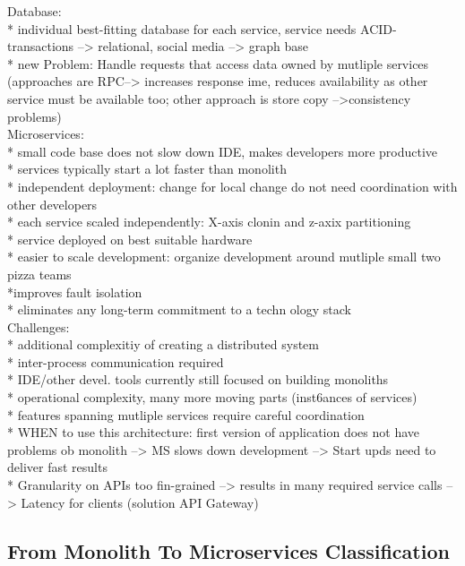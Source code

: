 Database: \\
* individual best-fitting database for each service, service needs ACID-transactions --> relational, social media --> graph base\\
* new Problem: Handle requests that access data owned by mutliple services (approaches are RPC--> increases response ime, reduces availability as other service must be available too; other approach is store copy -->consistency problems)\\

Microservices:\\
* small code base does not slow down IDE, makes developers more productive\\
* services typically start a lot faster than monolith\\
* independent deployment: change for local change do not need coordination with other developers	\\
* each service scaled independently: X-axis clonin and z-axix partitioning\\
* service deployed on best suitable hardware\\
* easier to scale development: organize development around mutliple small two pizza teams\\
*improves fault isolation\\
* eliminates any long-term commitment to a techn ology stack\\


Challenges: \\
* additional complexitiy of creating a distributed system\\
* inter-process communication required\\
* IDE/other devel. tools currently still focused on building monoliths\\
* operational complexity, many more moving parts (inst6ances of services)\\
* features spanning mutliple services require careful coordination\\
* WHEN to use this architecture: first version  of application does not have problems ob monolith --> MS slows down development --> Start upds need to deliver fast results\\
* Granularity on APIs too fin-grained --> results in many required service calls --> Latency for clients (solution API Gateway)\\

\subsection{From Monolith To Microservices Classification}
\cite{ClassificationOfRefactoring} \\

